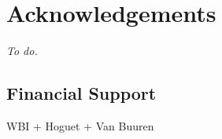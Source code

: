 \chapter*{Acknowledgements}
\thispagestyle{empty}


\emph{To do.}

\section*{Financial Support}
\label{sec:financial-support}
WBI + Hoguet + Van Buuren

\clearpage

